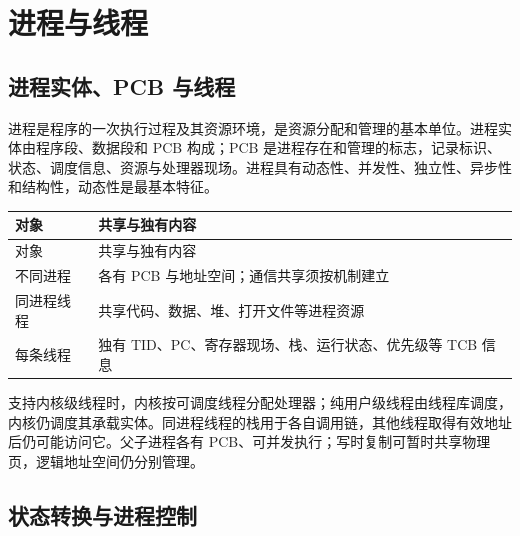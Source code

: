 \chapter{进程与线程}\label{OS02}

\section{进程实体、PCB 与线程}\label{OS02-process-thread}

进程是程序的一次执行过程及其资源环境，是资源分配和管理的基本单位。进程实体由程序段、数据段和 PCB 构成；PCB 是进程存在和管理的标志，记录标识、状态、调度信息、资源与处理器现场。进程具有动态性、并发性、独立性、异步性和结构性，动态性是最基本特征。

\par\smallskip
{\fontsize{9.3}{12}\selectfont\setlength{\tabcolsep}{2.5pt}\setlength{\LTleft}{0pt}\setlength{\LTright}{0pt}
\begin{longtable}{@{}>{\raggedright\arraybackslash}p{}>{\raggedright\arraybackslash}p{}@{}}
\toprule
对象 & 共享与独有内容 \\

\midrule\endfirsthead\toprule
对象 & 共享与独有内容 \\

\midrule\endhead\bottomrule\endfoot
不同进程 & 各有 PCB 与地址空间；通信共享须按机制建立 \\

同进程线程 & 共享代码、数据、堆、打开文件等进程资源 \\

每条线程 & 独有 TID、PC、寄存器现场、栈、运行状态、优先级等 TCB 信息 \\

\end{longtable}}
\par\smallskip

支持内核级线程时，内核按可调度线程分配处理器；纯用户级线程由线程库调度，内核仍调度其承载实体。同进程线程的栈用于各自调用链，其他线程取得有效地址后仍可能访问它。父子进程各有 PCB、可并发执行；写时复制可暂时共享物理页，逻辑地址空间仍分别管理。

\section{状态转换与进程控制}\label{OS02-states}

